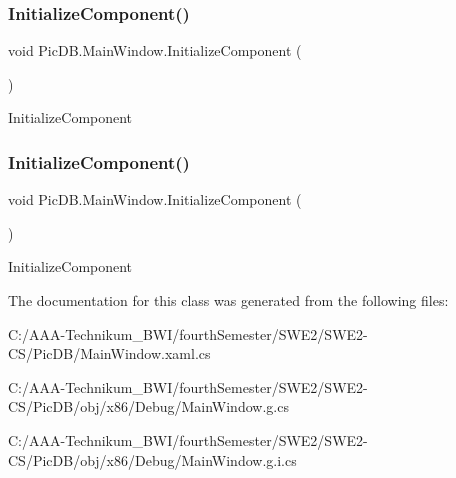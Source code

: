 \subsubsection{\texorpdfstring{Initialize\+Component()}{InitializeComponent()}\hspace{0.1cm}{\footnotesize\ttfamily [1/2]}}
{\footnotesize\ttfamily void Pic\+D\+B.\+Main\+Window.\+Initialize\+Component (\begin{DoxyParamCaption}{ }\end{DoxyParamCaption})}



Initialize\+Component 

\mbox{\label{class_pic_d_b_1_1_main_window_a5b3ff51020040626afa96b204d0e41c6}} 
\subsubsection{\texorpdfstring{Initialize\+Component()}{InitializeComponent()}\hspace{0.1cm}{\footnotesize\ttfamily [2/2]}}
{\footnotesize\ttfamily void Pic\+D\+B.\+Main\+Window.\+Initialize\+Component (\begin{DoxyParamCaption}{ }\end{DoxyParamCaption})}



Initialize\+Component 



The documentation for this class was generated from the following files\+:\begin{DoxyCompactItemize}
\item 
C\+:/\+A\+A\+A-\/\+Technikum\+\_\+\+B\+W\+I/fourth\+Semester/\+S\+W\+E2/\+S\+W\+E2-\/\+C\+S/\+Pic\+D\+B/Main\+Window.\+xaml.\+cs\item 
C\+:/\+A\+A\+A-\/\+Technikum\+\_\+\+B\+W\+I/fourth\+Semester/\+S\+W\+E2/\+S\+W\+E2-\/\+C\+S/\+Pic\+D\+B/obj/x86/\+Debug/Main\+Window.\+g.\+cs\item 
C\+:/\+A\+A\+A-\/\+Technikum\+\_\+\+B\+W\+I/fourth\+Semester/\+S\+W\+E2/\+S\+W\+E2-\/\+C\+S/\+Pic\+D\+B/obj/x86/\+Debug/Main\+Window.\+g.\+i.\+cs\end{DoxyCompactItemize}
